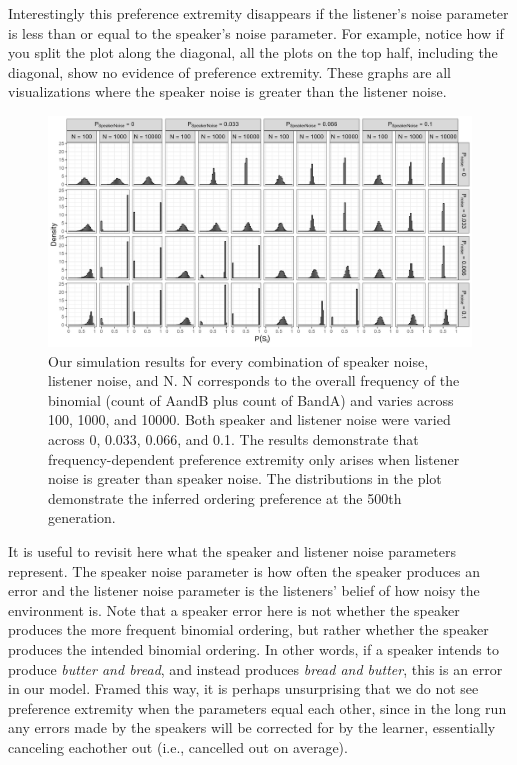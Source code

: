 \documentclass[10pt, letterpaper]{article}
\newenvironment{CodeChunk}{}{}
\begin{document}
Interestingly this preference extremity disappears if the listener's
noise parameter is less than or equal to the speaker's noise parameter.
For example, notice how if you split the plot along the diagonal, all
the plots on the top half, including the diagonal, show no evidence of
preference extremity. These graphs are all visualizations where the
speaker noise is greater than the listener noise.

\begin{CodeChunk}
\begin{figure}[!htb]
\includegraphics[width=1\linewidth]{Figures/full_plot_smaller} \caption[Our simulation results for every combination of speaker noise, listener noise, and N]{Our simulation results for every combination of speaker noise, listener noise, and N. N corresponds to the overall frequency of the binomial (count of AandB plus count of BandA) and varies across 100, 1000, and 10000. Both speaker and listener noise were varied across 0, 0.033, 0.066, and 0.1. The results demonstrate that frequency-dependent preference extremity only arises when listener noise is greater than speaker noise. The distributions in the plot demonstrate the inferred ordering preference at the 500th generation.}\label{fig:fullsimsplot}
\end{figure}
\end{CodeChunk}

It is useful to revisit here what the speaker and listener noise
parameters represent. The speaker noise parameter is how often the
speaker produces an error and the listener noise parameter is the
listeners' belief of how noisy the environment is. Note that a speaker
error here is not whether the speaker produces the more frequent
binomial ordering, but rather whether the speaker produces the intended
binomial ordering. In other words, if a speaker intends to produce
\emph{butter and bread}, and instead produces \emph{bread and butter},
this is an error in our model. Framed this way, it is perhaps
unsurprising that we do not see preference extremity when the parameters
equal each other, since in the long run any errors made by the speakers
will be corrected for by the learner, essentially canceling eachother
out (i.e., cancelled out on average).
\end{document}
